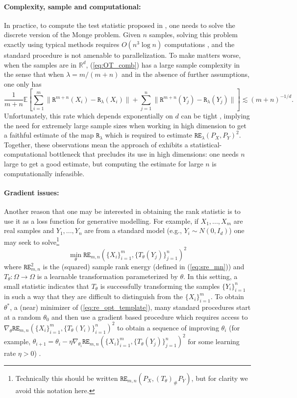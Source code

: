 \documentclass{article}
\theoremstyle{definition}
\newcommand{\R}{\mathtt{R}_{\lambda}}
\newcommand{\Rn}{\mathtt{R}^{m+n}}
\newcommand{\RE}{\mathtt{RE}_{\lambda}}
\newcommand{\REn}{\mathtt{RE}_{m,n}}
\begin{document}
\paragraph{Complexity, sample and computational:} In practice, to compute the test statistic proposed in \cite{deb2021multivariate}, one needs to solve the discrete version of the Monge problem. Given $n$ samples, solving this problem exactly using typical methods requires $O(n^3 \log n)$ computations \cite{peyre2019computational}, and the standard procedure is not amenable to parallelization. To make matters worse, when the samples are in $\mathbb{R}^d$, (\ref{eq:OT_comb})
has a large sample complexity in the sense that when $\lambda = m/(m+n)$ and in the absence of further assumptions, one only has
\begin{equation*}
    \frac{1}{m+n}\mathbb{E}\left [ \sum_{i=1}^m \|\Rn(X_i) - \R(X_i) \| + \sum_{j=1}^n \|\Rn(Y_j) - \R(Y_j) \| \right ] \lesssim (m+n)^{-1/d}.
\end{equation*}
Unfortunately, this rate which depends exponentially on $d$ can be tight \cite{dudley1969speed}, implying the need for extremely large sample sizes when working in high dimension to get a faithful estimate of the map $\R$ which is required to estimate $\RE(P_X, P_Y)^2$. Together, these observations mean the approach of \cite{deb2021multivariate} exhibits a statistical-computational bottleneck that precludes its use in high dimensions: one needs $n$ large to get a good estimate, but computing the estimate for large $n$ is computationally infeasible.
\paragraph{Gradient issues:} Another reason that one may be interested in obtaining the rank statistic is to use it as a loss function for generative modelling. For example, if $X_1,...,X_m$ are real samples and $Y_1,...,Y_n$ are from a standard model (e.g., $Y_i \sim N(0,I_d)$) one may seek to solve\footnote{Technically this should be written $\REn(P_X, (T_\theta)_\#P_Y)$, but for clarity we avoid this notation here.}
\begin{equation} \label{eq:re_opt_template}
    \min_{\theta} \REn(\{X_i\}_{i=1}^m, \{T_\theta(Y_j)\}_{j=1}^n)^2
\end{equation}
where $\REn^2$ is the (squared) sample rank energy (defined in (\ref{eq:sre_mn})) and $T_\theta:\Omega \rightarrow \Omega$ is a learnable transformation parameterized by $\theta$. In this setting, a small statistic indicates that $T_\theta$ is successfully transforming the samples $\{Y_i\}_{i=1}^n$ in such a way that they are difficult to distinguish from the $\{X_i\}_{i=1}^m$. To obtain $\theta^*$, a (near) minimizer of (\ref{eq:re_opt_template}), many standard procedures  start at a random $\theta_0$ and then use a gradient based procedure which requires access to $\nabla_\theta \REn(\{X_i\}_{i=1}^m,  \{T_\theta(Y_i)\}_{i=1}^n)^2$ to obtain a sequence of improving $\theta_i$ (for example, $\theta_{i+1} = \theta_i - \eta \nabla_{\theta_i} \REn(\{X_i\}_{i=1}^m,  \{T_\theta(Y_j)\}_{j=1}^n)^2$ for some learning rate $\eta > 0$) \cite{bottou2012stochastic, boyd2004convex}.
\end{document}
